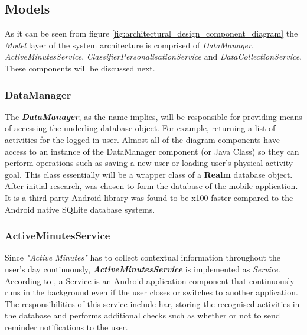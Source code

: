         \subsection{Models}
        As it can be seen from figure \ref{fig:architectural_design_component_diagram} the \textit{Model} layer of the system architecture is comprised of \textit{DataManager}, \textit{ActiveMinutesService}, \textit{ClassifierPersonalisationService} and \textit{DataCollectionService}. These components will be discussed next.
        
            \subsubsection{DataManager}
            The \textbf{\textit{DataManager}}, as the name implies, will be responsible for providing means of accessing the underling database object. For example, returning a list of activities for the logged in user. Almost all of the diagram components have access to an instance of the DataManager component (or Java Class) so they can perform operations such as saving a new user or loading user's physical activity goal. This class essentially will be a wrapper class of a \textbf{Realm} database object. After initial research, \citet{realm2014} was chosen to form the database of the mobile application. It is a third-party Android library was found to be x100 faster compared to the Android native SQLite database systems.
            
            \subsubsection{ActiveMinutesService}
            Since \textit{"Active Minutes"} has to collect contextual information throughout the user's day continuously, \textbf{\textit{ActiveMinutesService}} is implemented as \textit{Service}. According to \citet{googleservices2017}, a Service is an Android application component that continuously runs in the background even if the user closes or switches to another application. The responsibilities of this service include \gls{har}, storing the recognised activities in the database and performs additional checks such as whether or not to send reminder notifications to the user.
            
